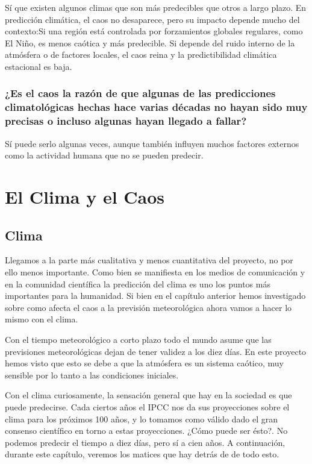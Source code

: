 \documentclass[
  11pt,
  a4paper,
  DIV=11,
  numbers=noendperiod]{scrreprt}
\begin{document}
Sí que existen algunos climas que son más predecibles que otros a largo
plazo. En predicción climática, el caos no desaparece, pero su impacto
depende mucho del contexto:Si una región está controlada por
forzamientos globales regulares, como El Niño, es menos caótica y más
predecible. Si depende del ruido interno de la atmósfera o de factores
locales, el caos reina y la predictibilidad climática estacional es
baja.

\section{¿Es el caos la razón de que algunas de las predicciones
climatológicas hechas hace varias décadas no hayan sido muy precisas o
incluso algunas hayan llegado a
fallar?}\label{es-el-caos-la-razuxf3n-de-que-algunas-de-las-predicciones-climatoluxf3gicas-hechas-hace-varias-duxe9cadas-no-hayan-sido-muy-precisas-o-incluso-algunas-hayan-llegado-a-fallar}

Sí puede serlo algunas veces, aunque también influyen muchos factores
externos como la actividad humana que no se pueden predecir.

\part{El Clima y el Caos}

\chapter{Clima}\label{clima}

Llegamos a la parte más cualitativa y menos cuantitativa del proyecto,
no por ello menos importante. Como bien se manifiesta en los medios de
comunicación y en la comunidad científica la predicción del clima es uno
los puntos más importantes para la humanidad. Si bien en el capítulo
anterior hemos investigado sobre como afecta el caos a la previsión
meteorológica ahora vamos a hacer lo mismo con el clima.

Con el tiempo meteorológico a corto plazo todo el mundo asume que las
previsiones meteorológicas dejan de tener validez a los diez días. En
este proyecto hemos visto que esto se debe a que la atmósfera es un
sistema caótico, muy sensible por lo tanto a las condiciones iniciales.

Con el clima curiosamente, la sensación general que hay en la sociedad
es que puede predecirse. Cada ciertos años el IPCC nos da sus
proyecciones sobre el clima para los próximos 100 años, y lo tomamos
como válido dado el gran consenso científico en torno a estas
proyecciones. ¿Cómo puede ser ésto?. No podemos predecir el tiempo a
diez días, pero sí a cien años. A continuación, durante este capítulo,
veremos los matices que hay detrás de de todo esto.
\end{document}
